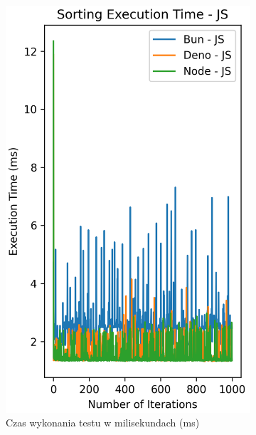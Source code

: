 \begin{figure}[H]
  \centering
  \begin{subfigure}[b]{0.42\textwidth}
    \centering
    \includegraphics[width=\textwidth]{Figures/sorting/sorting_radix_1000_10000_js_time.png}
    \caption{Czas wykonania testu w milisekundach (ms)}
    \label{fig:radix_sorting_e4_time}
  \end{subfigure}
  \begin{subfigure}[b]{0.42\textwidth}
    \centering

\end{subfigure}
\end{figure}
